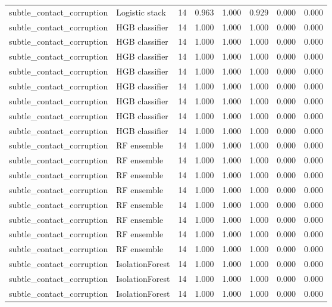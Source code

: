 {\begin{longtable}{llrrrrrr}
subtle\_contact\_corruption & Logistic stack & 14 & 0.963 & 1.000 & 0.929 & 0.000 & 0.000 \\
subtle\_contact\_corruption & HGB classifier & 14 & 1.000 & 1.000 & 1.000 & 0.000 & 0.000 \\
subtle\_contact\_corruption & HGB classifier & 14 & 1.000 & 1.000 & 1.000 & 0.000 & 0.000 \\
subtle\_contact\_corruption & HGB classifier & 14 & 1.000 & 1.000 & 1.000 & 0.000 & 0.000 \\
subtle\_contact\_corruption & HGB classifier & 14 & 1.000 & 1.000 & 1.000 & 0.000 & 0.000 \\
subtle\_contact\_corruption & HGB classifier & 14 & 1.000 & 1.000 & 1.000 & 0.000 & 0.000 \\
subtle\_contact\_corruption & HGB classifier & 14 & 1.000 & 1.000 & 1.000 & 0.000 & 0.000 \\
subtle\_contact\_corruption & HGB classifier & 14 & 1.000 & 1.000 & 1.000 & 0.000 & 0.000 \\
subtle\_contact\_corruption & HGB classifier & 14 & 1.000 & 1.000 & 1.000 & 0.000 & 0.000 \\
subtle\_contact\_corruption & RF ensemble & 14 & 1.000 & 1.000 & 1.000 & 0.000 & 0.000 \\
subtle\_contact\_corruption & RF ensemble & 14 & 1.000 & 1.000 & 1.000 & 0.000 & 0.000 \\
subtle\_contact\_corruption & RF ensemble & 14 & 1.000 & 1.000 & 1.000 & 0.000 & 0.000 \\
subtle\_contact\_corruption & RF ensemble & 14 & 1.000 & 1.000 & 1.000 & 0.000 & 0.000 \\
subtle\_contact\_corruption & RF ensemble & 14 & 1.000 & 1.000 & 1.000 & 0.000 & 0.000 \\
subtle\_contact\_corruption & RF ensemble & 14 & 1.000 & 1.000 & 1.000 & 0.000 & 0.000 \\
subtle\_contact\_corruption & RF ensemble & 14 & 1.000 & 1.000 & 1.000 & 0.000 & 0.000 \\
subtle\_contact\_corruption & RF ensemble & 14 & 1.000 & 1.000 & 1.000 & 0.000 & 0.000 \\
subtle\_contact\_corruption & IsolationForest & 14 & 1.000 & 1.000 & 1.000 & 0.000 & 0.000 \\
subtle\_contact\_corruption & IsolationForest & 14 & 1.000 & 1.000 & 1.000 & 0.000 & 0.000 \\
subtle\_contact\_corruption & IsolationForest & 14 & 1.000 & 1.000 & 1.000 & 0.000 & 0.000 \\

\end{longtable}}
